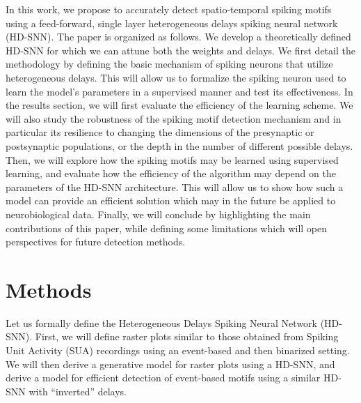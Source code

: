 \documentclass[runningheads]{llncs}
\begin{document}
In this work, we propose to accurately detect spatio-temporal spiking motifs using a feed-forward, single layer heterogeneous delays spiking neural network (HD-SNN). The paper is organized as follows. We develop a theoretically defined HD-SNN for which we can attune both the weights and delays. We first detail the methodology by defining the basic mechanism of spiking neurons that utilize heterogeneous delays. 
This will allow us to formalize the spiking neuron used to learn the model's parameters in a supervised manner and test its effectiveness. In the results section, we will first evaluate the efficiency of the learning scheme. We will also study the robustness of the spiking motif detection mechanism and in particular its resilience to changing the dimensions of the presynaptic or postsynaptic populations, or the depth in the number of different possible delays. Then, we will explore how the spiking motifs may be learned using supervised learning, and evaluate how the efficiency of the algorithm may depend on the parameters of the HD-SNN architecture. This will allow us to show how such a model can provide an efficient solution which may in the future be applied to neurobiological data.  Finally, we will conclude by highlighting the main contributions of this paper, while defining some limitations which will open perspectives for future detection methods. %
%
\section{Methods}
\label{sec:methods}
Let us formally define the Heterogeneous Delays Spiking Neural Network (HD-SNN). First, we will define raster plots similar to those obtained from Spiking Unit Activity (SUA) recordings using an event-based and then binarized setting. We will then derive a generative model for raster plots using a HD-SNN, and derive a model for efficient detection of event-based motifs using a similar HD-SNN with ``inverted'' delays.
%
\end{document}
